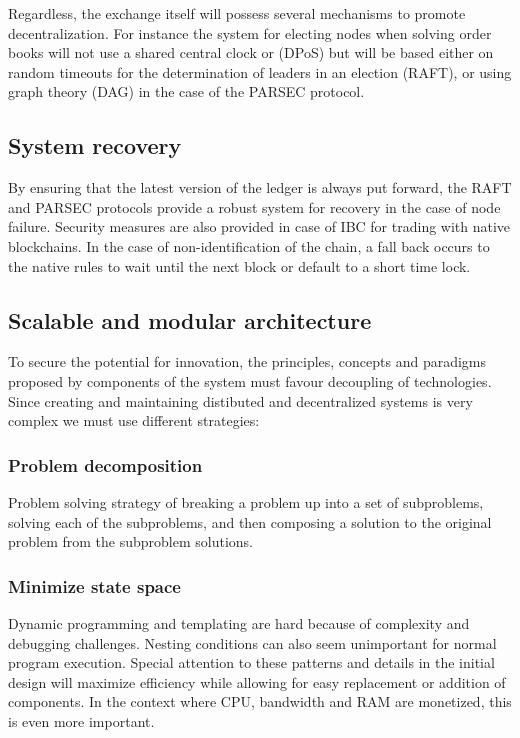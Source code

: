 \documentclass[]{article}
\begin{document}
	 Regardless, the exchange itself will possess several mechanisms to promote decentralization. 
	 For instance the system for electing nodes when solving order books will not use a shared central clock or (DPoS) 
	 but will be based either on random timeouts for the determination of leaders in an election (RAFT), 
	 or using graph theory (DAG) in the case of the PARSEC protocol.
	 
	\subsection{System recovery}
	By ensuring that the latest version of the ledger is always put forward, 
	the RAFT and PARSEC protocols provide a robust system for recovery in the case of node failure.
	Security measures are also provided in case of IBC for trading with native blockchains. 
	In the case of non-identification of the chain, a fall back occurs to the native rules to wait until the next block or default to a short time lock.
	
	\subsection{Scalable and modular architecture}
	To secure the potential for innovation, the principles, 
	concepts and paradigms proposed by components of the system
	must favour decoupling of technologies. 
	Since creating and maintaining distibuted and decentralized systems
	is very complex we must use different strategies: 
	\subsubsection{Problem decomposition}
	Problem solving strategy of breaking a problem up into a set of subproblems, solving each of the subproblems, 
	and then composing a solution to the original problem from the subproblem solutions.
	\subsubsection{Minimize state space}
	Dynamic programming and templating are hard because of complexity and debugging challenges. 
	Nesting conditions can also seem unimportant for normal program execution.
	Special attention to these patterns and details in the initial design will maximize efficiency while allowing for easy replacement or addition of components.   
	In the context where CPU, bandwidth and RAM are monetized, this is even more important. 
	
\end{document}
